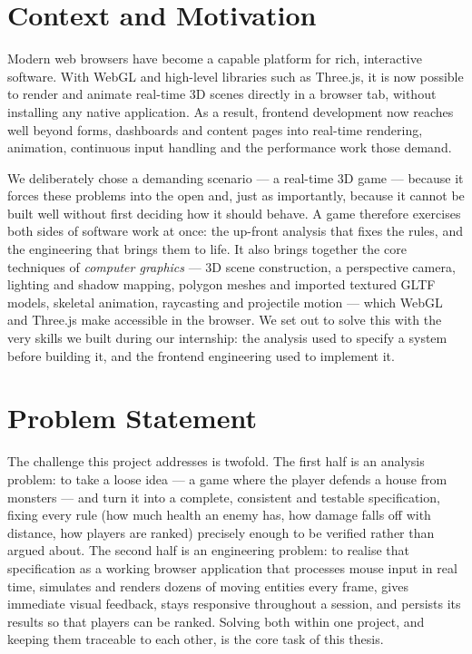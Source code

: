 \documentclass[12pt,a4paper]{report}
\begin{document}
\section{Context and Motivation}

Modern web browsers have become a capable platform for rich, interactive
software. With WebGL and high-level libraries such as Three.js, it is now
possible to render and animate real-time 3D scenes directly in a browser tab,
without installing any native application. As a result, frontend development now
reaches well beyond forms, dashboards and content pages into real-time
rendering, animation, continuous input handling and the performance work those
demand.

 We deliberately chose a demanding scenario --- a real-time 3D
game --- because it forces these problems into the open and, just as importantly,
because it cannot be built well without first deciding how it should behave. A
game therefore exercises both sides of software work at once: the up-front
analysis that fixes the rules, and the engineering that brings them to life. It
also brings together the core techniques of \emph{computer graphics} --- 3D scene
construction, a perspective camera, lighting and shadow mapping, polygon meshes
and imported textured GLTF models, skeletal animation, raycasting and projectile
motion --- which WebGL and Three.js make accessible in the browser. We set out to
solve this with the very skills we built during our internship: the analysis used
to specify a system before building it, and the frontend engineering used to
implement it.

\section{Problem Statement}

The challenge this project addresses is twofold. The first half is an analysis
problem: to take a loose idea --- a game where the player defends a house from
monsters --- and turn it into a complete, consistent and testable specification,
fixing every rule (how much health an enemy has, how damage falls off with
distance, how players are ranked) precisely enough to be verified rather than
argued about. The second half is an engineering problem: to realise that
specification as a working browser application that processes mouse input in
real time, simulates and renders dozens of moving entities every frame, gives
immediate visual feedback, stays responsive throughout a session, and persists
its results so that players can be ranked. Solving both within one project, and
keeping them traceable to each other, is the core task of this thesis.
\end{document}
